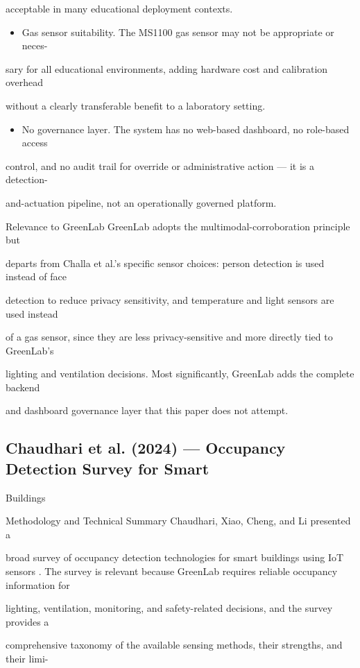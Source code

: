 acceptable in many educational deployment contexts.

\begin{itemize}
	\item Gas sensor suitability. The MS1100 gas sensor may not be appropriate or neces-
\end{itemize}
sary for all educational environments, adding hardware cost and calibration overhead

without a clearly transferable beneﬁt to a laboratory setting.

\begin{itemize}
	\item No governance layer. The system has no web-based dashboard, no role-based access
\end{itemize}
control, and no audit trail for override or administrative action --- it is a detection-

and-actuation pipeline, not an operationally governed platform.

Relevance to GreenLab GreenLab adopts the multimodal-corroboration principle but

departs from Challa et al.'s speciﬁc sensor choices: person detection is used instead of face

detection to reduce privacy sensitivity, and temperature and light sensors are used instead

of a gas sensor, since they are less privacy-sensitive and more directly tied to GreenLab's

lighting and ventilation decisions. Most signiﬁcantly, GreenLab adds the complete backend

and dashboard governance layer that this paper does not attempt.


\subsection{Chaudhari et al. (2024) --- Occupancy Detection Survey for Smart}
Buildings

Methodology and Technical Summary Chaudhari, Xiao, Cheng, and Li presented a

broad survey of occupancy detection technologies for smart buildings using IoT sensors \cite{chaudhari2024}. The survey is relevant because GreenLab requires reliable occupancy information for

lighting, ventilation, monitoring, and safety-related decisions, and the survey provides a

comprehensive taxonomy of the available sensing methods, their strengths, and their limi-


